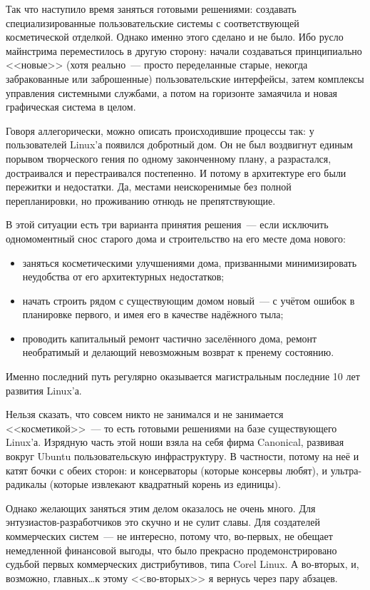 Так что наступило время заняться готовыми решениями: создавать специализированные пользовательские системы с соответствующей косметической отделкой. Однако именно этого сделано и не было. Ибо русло майнстрима переместилось в другую сторону: начали создаваться принципиально <<новые>> (хотя реально~--- просто переделанные старые, некогда забракованные или заброшенные) пользовательские интерфейсы, затем комплексы управления системными службами, а потом на горизонте замаячила и новая графическая система в целом.

Говоря аллегорически, можно описать происходившие процессы так: у пользователей Linux'а появился добротный дом. Он не был воздвигнут единым порывом творческого гения по одному законченному плану, а разрастался, достраивался и перестраивался постепенно. И потому в архитектуре его были пережитки и недостатки. Да, местами неискоренимые без полной перепланировки, но проживанию отнюдь не препятствующие.

В этой ситуации есть три варианта принятия решения~--- если исключить одномоментный снос старого дома и строительство на его месте дома нового:

\begin{itemize}
	\item заняться косметическими улучшениями дома, призванными минимизировать неудобства от его архитектурных недостатков; 
	\item начать строить рядом с существующим домом новый~--- с учётом ошибок в планировке первого, и имея его в качестве надёжного тыла; 
	\item проводить капитальный ремонт частично заселённого дома, ремонт необратимый и делающий невозможным возврат к пренему состоянию. 
\end{itemize}

Именно последний путь регулярно оказывается магистральным последние 10 лет развития Linux'а.

Нельзя сказать, что совсем никто не занимался и не занимается <<косметикой>>~--- то есть готовыми решениями на базе существующего Linux'а. Изрядную часть этой ноши взяла на себя фирма Canonical, развивая вокруг Ubuntu пользовательскую инфраструктуру. В частности, потому на неё и катят бочки с обеих сторон: и консерваторы (которые консервы любят), и ультра-радикалы (которые извлекают квадратный корень из единицы).

Однако желающих заняться этим делом оказалось не очень много. Для энтузиастов-разработчиков это скучно и не сулит славы. Для создателей коммерческих систем~--- не интересно, потому что, во-первых, не обещает немедленной финансовой выгоды, что было прекрасно продемонстрировано судьбой первых коммерческих дистрибутивов, типа Corel Linux. А во-вторых, и, возможно, главных\dots к этому <<во-вторых>> я вернусь через пару абзацев.


